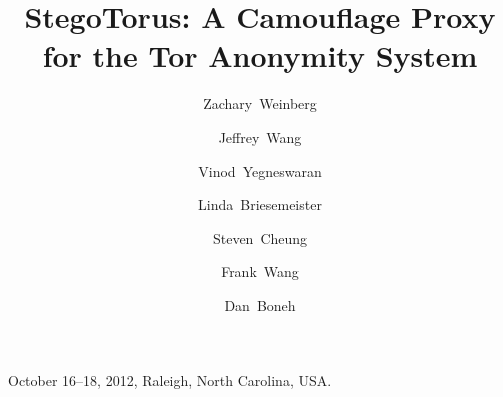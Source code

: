 \documentclass{sig-alternate}
\begin{document}
 {October 16--18, 2012, Raleigh, North Carolina, USA.}

\title{StegoTorus: A Camouflage Proxy for the Tor Anonymity System}

\author[1,2]{Zachary~Weinberg}
\author[3]{  Jeffrey~Wang}
\author[2]{Vinod~Yegneswaran}
\author[2]{Linda~Briesemeister}
\author[2]{Steven~Cheung}
\author[3]{Frank~Wang}
\author[3]{Dan~Boneh}


\maketitle














\end{document}
